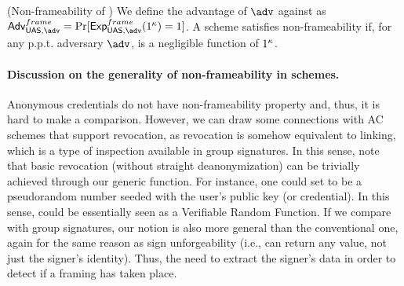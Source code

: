 \begin{definition}{(Non-frameability of \UAS)}
  \label{def:frame-uas}
  We define the advantage \AdvNonframe of $\adv$ against \ExpNonframe as
  $\AdvNonframe=\Pr\lbrack\ExpNonframe(1^\secpar)=1\rbrack$.
  A \GSAC scheme satisfies non-frameability if, for any p.p.t. adversary $\adv$,
  \AdvNonframe is a negligible function of $1^\kappa$.
\end{definition}

\paragraph{Discussion on the generality of non-frameability in \UAS schemes.} %
Anonymous credentials do not have non-frameability property and, thus, it is
hard to make a comparison. However, we can draw some connections with AC schemes
that support revocation, as revocation is somehow equivalent to linking, which
is a type of inspection available in group signatures. In this sense, note that
basic revocation (without straight deanonymization) can be trivially achieved
through our generic \Open function. For instance, one could set \finsp to
be a pseudorandom number seeded with the user's public key (or credential). In
this sense, \Open could be essentially seen as a Verifiable Random Function.
If we compare with group signatures, our notion is also more general than the
conventional one, again for the same reason as sign unforgeability (i.e., \Open
can return any value, not just the signer's identity). Thus, the need to extract
the signer's data in order to detect if a framing has taken place.
  
